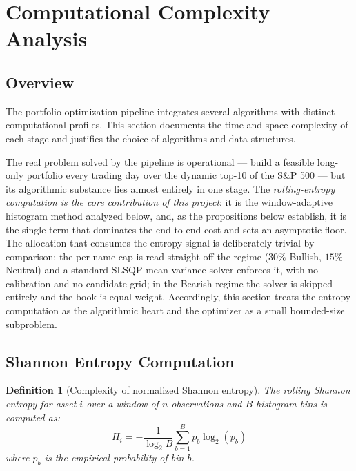 \documentclass[a4paper,12pt]{article}
\newtheorem{definition}{Definition}[section]
\begin{document}
\section{Computational Complexity Analysis}
\label{sec:complexity}

\subsection{Overview}

The portfolio optimization pipeline integrates several algorithms with distinct computational profiles. This section documents the time and space complexity of each stage and justifies the choice of algorithms and data structures.

The real problem solved by the pipeline is operational --- build a feasible long-only portfolio every trading day over the dynamic top-10 of the S\&P 500 --- but its algorithmic substance lies almost entirely in one stage. The \emph{rolling-entropy computation is the core contribution of this project}: it is the window-adaptive histogram method analyzed below, and, as the propositions below establish, it is the single term that dominates the end-to-end cost and sets an asymptotic floor. The allocation that consumes the entropy signal is deliberately trivial by comparison: the per-name cap is read straight off the regime ($30\%$ Bullish, $15\%$ Neutral) and a standard SLSQP mean-variance solver enforces it, with no calibration and no candidate grid; in the Bearish regime the solver is skipped entirely and the book is equal weight. Accordingly, this section treats the entropy computation as the algorithmic heart and the optimizer as a small bounded-size subproblem.

\subsection{Shannon Entropy Computation}

\begin{definition}[Complexity of normalized Shannon entropy]
The rolling Shannon entropy for asset $i$ over a window of $n$ observations and $B$ histogram bins is computed as:
\[
H_i = -\frac{1}{\log_2 B} \sum_{b=1}^{B} p_b \log_2(p_b)
\]
where $p_b$ is the empirical probability of bin $b$.
\end{definition}
\end{document}
